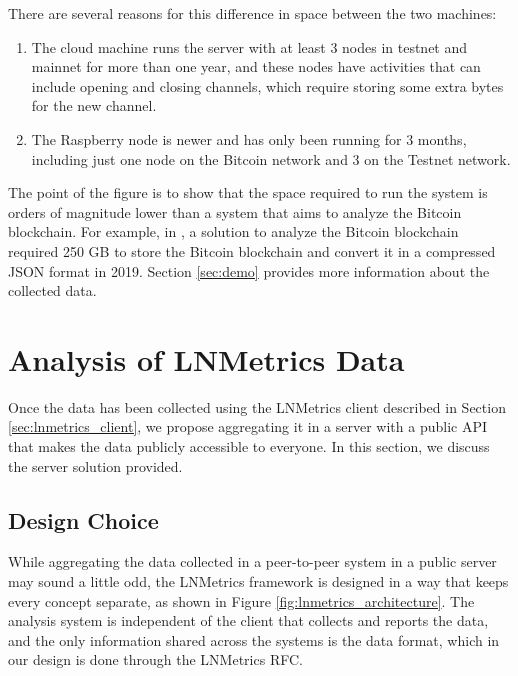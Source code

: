 There are several reasons for this difference in space between the two machines:

\begin{enumerate}
  \item The cloud machine runs the server with at least 3 nodes in testnet and mainnet for more
        than one year, and these nodes have activities that can include opening and closing channels,
        which require storing some extra bytes for the new channel.
  \item The Raspberry node is newer and has only been running for 3 months, including just one node on
        the Bitcoin network and 3 on the Testnet network.
\end{enumerate}

The point of the figure is to show that the space required to run the system is
orders of magnitude lower than a system that aims to analyze the Bitcoin blockchain.
For example, in \cite{Palazzo_Estrazione_di_Informazioni_2021}, a solution to analyze the Bitcoin blockchain
required 250 GB to store the Bitcoin blockchain and convert it in a compressed JSON format in 2019.
Section \ref{sec:demo} provides more information about the collected data.

\section{Analysis of LNMetrics Data}
\label{sec:lnmetrics_server}

Once the data has been collected using the LNMetrics client described in 
Section \ref{sec:lnmetrics_client}, we propose aggregating it in a server with 
a public API that makes the data publicly accessible to everyone. In this 
section, we discuss the server solution provided.

\subsection{Design Choice}

While aggregating the data collected in a peer-to-peer system in a public 
server may sound a little odd, the LNMetrics framework is designed in a way 
that keeps every concept separate, as shown in Figure \ref{fig:lnmetrics_architecture}. 
The analysis system is independent of the client that collects and reports the data, and
the only information shared across the systems is the data format, which in our
design is done through the LNMetrics RFC.

